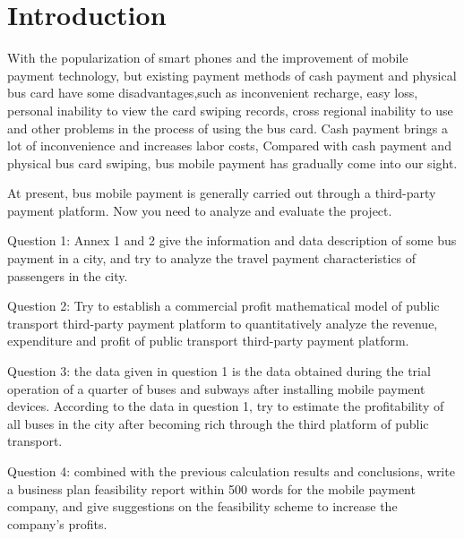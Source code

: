 \documentclass[../mcmpaper]{subfiles}
\begin{document}
\section{Introduction}
With the popularization of smart phones and the improvement of mobile payment technology, but existing payment methods of cash payment and physical bus card have some disadvantages,such as inconvenient recharge, easy loss, personal inability to view the card swiping records, cross regional inability to use and other problems in the process of using the bus card. Cash payment brings a lot of inconvenience and increases labor costs, Compared with cash payment and physical bus card swiping, bus mobile payment has gradually come into our sight.
\par
At present, bus mobile payment is generally carried out through a third-party payment platform. Now you need to analyze and evaluate the project.
\par
Question 1: Annex 1 and 2 give the information and data description of some bus payment in a city, and try to analyze the travel payment characteristics of passengers in the city.
\par
Question 2: Try to establish a commercial profit mathematical model of public transport third-party payment platform to quantitatively analyze the revenue, expenditure and profit of public transport third-party payment platform.
\par
Question 3: the data given in question 1 is the data obtained during the trial operation of a quarter of buses and subways after installing mobile payment devices. According to the data in question 1, try to estimate the profitability of all buses in the city after becoming rich through the third platform of public transport.
\par
Question 4: combined with the previous calculation results and conclusions, write a business plan feasibility report within 500 words for the mobile payment company, and give suggestions on the feasibility scheme to increase the company's profits.
\end{document}
